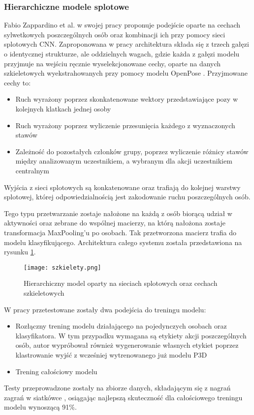 \subsubsection{Hierarchiczne modele splotowe}
Fabio Zappardino et al.\cite{Szkielety} w swojej pracy proponuje podejście oparte na cechach sylwetkowych poszczególnych osób oraz kombinacji ich przy pomocy sieci splotowych CNN. Zaproponowana w pracy architektura składa się z trzech gałęzi o identycznej strukturze, ale oddzielnych wagach, gdzie każda z gałęzi modelu przyjmuje na wejściu ręcznie wyselekcjonowane cechy, oparte na danych szkieletowych wyekstrahowanych przy pomocy modelu OpenPose \cite{openpose}. Przyjmowane cechy to: 
\begin{itemize}
    \item Ruch wyrażony poprzez skonkatenowane wektory przedstawiające pozy w kolejnych klatkach jednej osoby 
    \item Ruch wyrażony poprzez wyliczenie przesunięcia każdego z wyznaczonych stawów
    \item Zależność do pozostałych członków grupy, poprzez wyliczenie różnicy stawów między analizowanym uczestnikiem, a wybranym dla akcji uczestnikiem centralnym
\end{itemize}
Wyjścia z sieci splotowych są konkatenowane oraz trafiają do kolejnej warstwy splotowej, której odpowiedzialnością jest zakodowanie ruchu poszczególnych osób.

Tego typu przetwarzanie zostaje nałożone na każdą z osób biorącą udział w aktywności oraz zebrane do wspólnej macierzy, na którą nałożona zostaje transformacja MaxPooling'u po osobach. Tak przetworzona macierz trafia do modelu klasyfikującego. Architektura całego systemu została przedstawiona na rysunku \ref{fig:szkielety-arch}.
\begin{figure}[!h]
    \centering \texttt{[image: szkielety.png]}
    \caption{Hierarchiczny model oparty na sieciach splotowych oraz cechach szkieletowych}
    \label{fig:szkielety-arch}
\end{figure}

W pracy przetestowane zostały dwa podejścia do treningu modelu: 
\begin{itemize}
    \item Rozłączny trening modelu działającego na pojedynczych osobach oraz klasyfikatora. W tym przypadku wymagana są etykiety akcji poszczególnych osób, autor wypróbował również wygenerowanie własnych etykiet poprzez klastrowanie wyjść z wcześniej wytrenowanego już modelu P3D
    \item Trening całościowy modelu
\end{itemize}
Testy przeprowadzone zostały na zbiorze danych, składającym się z nagrań zagrań w siatkówce \cite{Ibrahim2015}, osiągając najlepszą skuteczność dla całościowego treningu modelu wynoszącą 91\%. 

